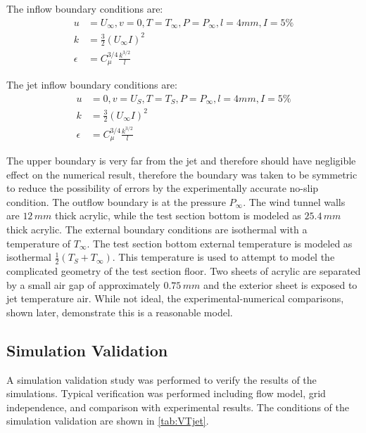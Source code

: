 \documentclass[preprint,12pt]{elsarticle}
\begin{document}
The inflow boundary conditions are:
\begin{subequations}
\label{eq:inflow}
\begin{align}
u&=U_\infty , v=0 , T=T_\infty , P = P_\infty , l=4 mm , I=5\%\\
k&=\frac{3}{2}\left(U_\infty I\right)^2 \\
\epsilon &=C_{\mu}^{3/4} \frac{k^{3/2}}{l}
\end{align}
\end{subequations}

The jet inflow boundary conditions are:
\begin{subequations}
\label{eq:inflowjet}
\begin{align}
u&=0 , v=U_S , T=T_S , P = P_\infty , l=4 mm , I=5\%\\
k&=\frac{3}{2}\left(U_\infty I\right)^2 \\
\epsilon &=C_{\mu}^{3/4} \frac{k^{3/2}}{l}
\end{align}
\end{subequations}

The upper boundary is very far from the jet and therefore should have negligible effect on the numerical result, therefore the boundary was taken to be symmetric to reduce the possibility of errors by the experimentally accurate no-slip condition.  The outflow boundary is at the pressure $P_{\infty}$.  The wind tunnel walls are $12\, mm$ thick acrylic, while the test section bottom is modeled as $25.4\,mm$ thick acrylic.  The external boundary conditions are isothermal with a temperature of $T_{\infty}$.  The test section bottom external temperature is modeled as isothermal $\frac{1}{2}\left(T_S+T_{\infty}\right)$.  This temperature is used to attempt to model the complicated geometry of the test section floor.  Two sheets of acrylic are separated by a small air gap of approximately $0.75\,mm$ and the exterior sheet is exposed to jet temperature air.  While not ideal, the experimental-numerical comparisons, shown later, demonstrate this is a reasonable model.

\subsection{Simulation Validation}
A simulation validation study was performed to verify the results of the simulations.  Typical verification was performed including flow model, grid independence, and comparison with experimental results.  The conditions of the simulation validation are shown in \cref{tab:VTjet}.
\end{document}
